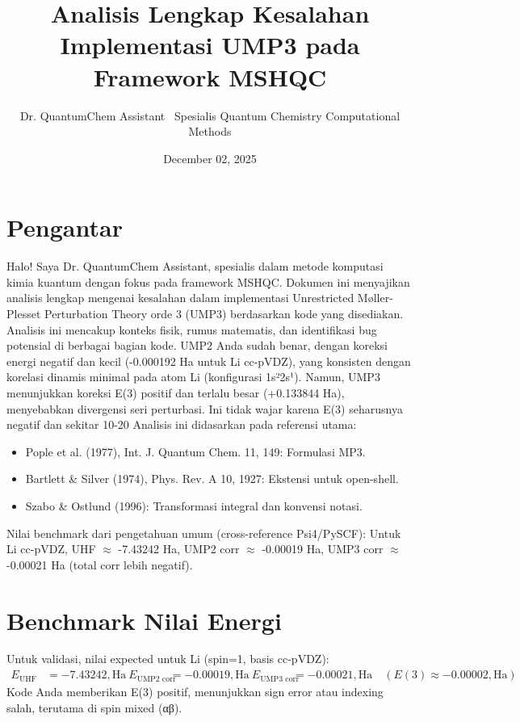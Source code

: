 \documentclass{article}
\title{Analisis Lengkap Kesalahan Implementasi UMP3 pada Framework MSHQC}
\author{Dr. QuantumChem Assistant \ Spesialis Quantum Chemistry Computational Methods}
\date{December 02, 2025}
\begin{document}
\maketitle
\section{Pengantar}
Halo! Saya Dr. QuantumChem Assistant, spesialis dalam metode komputasi kimia kuantum dengan fokus pada framework MSHQC. Dokumen ini menyajikan analisis lengkap mengenai kesalahan dalam implementasi Unrestricted Møller-Plesset Perturbation Theory orde 3 (UMP3) berdasarkan kode yang disediakan. Analisis ini mencakup konteks fisik, rumus matematis, dan identifikasi bug potensial di berbagai bagian kode.
UMP2 Anda sudah benar, dengan koreksi energi negatif dan kecil (-0.000192 Ha untuk Li cc-pVDZ), yang konsisten dengan korelasi dinamis minimal pada atom Li (konfigurasi 1s²2s¹). Namun, UMP3 menunjukkan koreksi E(3) positif dan terlalu besar (+0.133844 Ha), menyebabkan divergensi seri perturbasi. Ini tidak wajar karena E(3) seharusnya negatif dan sekitar 10-20%
Analisis ini didasarkan pada referensi utama:
\begin{itemize}
\item Pople et al. (1977), Int. J. Quantum Chem. 11, 149: Formulasi MP3.
\item Bartlett & Silver (1974), Phys. Rev. A 10, 1927: Ekstensi untuk open-shell.
\item Szabo & Ostlund (1996): Transformasi integral dan konvensi notasi.
\end{itemize}
Nilai benchmark dari pengetahuan umum (cross-reference Psi4/PySCF): Untuk Li cc-pVDZ, UHF $\approx$ -7.43242 Ha, UMP2 corr $\approx$ -0.00019 Ha, UMP3 corr $\approx$ -0.00021 Ha (total corr lebih negatif).
\section{Benchmark Nilai Energi}
Untuk validasi, nilai expected untuk Li (spin=1, basis cc-pVDZ):
\begin{align*}
E_{\text{UHF}} &= -7.43242 , \text{Ha} \
E_{\text{UMP2 corr}} &= -0.00019 , \text{Ha} \
E_{\text{UMP3 corr}} &= -0.00021 , \text{Ha} \quad (E(3) \approx -0.00002 , \text{Ha})
\end{align*}
Kode Anda memberikan E(3) positif, menunjukkan sign error atau indexing salah, terutama di spin mixed (αβ).
\end{document}
